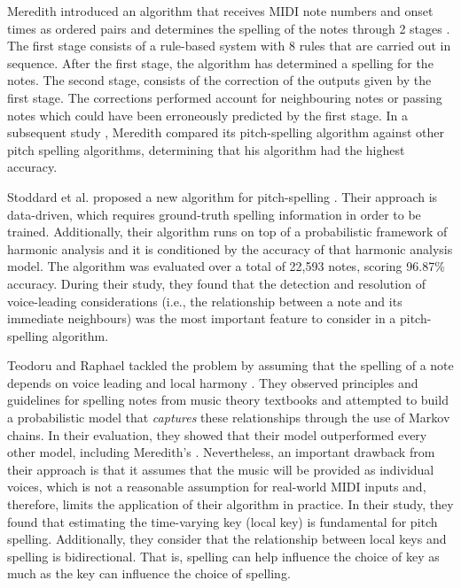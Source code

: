 Meredith introduced an algorithm that receives MIDI note numbers and onset times as ordered pairs and determines the spelling of the notes through 2 stages \cite{meredith2003pitch}. The first stage consists of a rule-based system with 8 rules that are carried out in sequence. After the first stage, the algorithm has determined a spelling for the notes. The second stage, consists of the correction of the outputs given by the first stage. The corrections performed account for neighbouring notes or passing notes which could have been erroneously predicted by the first stage. In a subsequent study \cite{meredith2005comparing}, Meredith compared its pitch-spelling algorithm against other pitch spelling algorithms, determining that his algorithm had the highest accuracy. 



Stoddard et al. proposed a new algorithm for pitch-spelling \cite{stoddard2004welltempered}. Their approach is data-driven, which requires ground-truth spelling information in order to be trained. Additionally, their algorithm runs on top of a probabilistic framework of harmonic analysis \cite{raphael2003harmonic} and it is conditioned by the accuracy of that harmonic analysis model. The algorithm was evaluated over a total of 22,593 notes, scoring 96.87\% accuracy. During their study, they found that the detection and resolution of voice-leading considerations (i.e., the relationship between a note and its immediate neighbours) was the most important feature to consider in a pitch-spelling algorithm.

Teodoru and Raphael tackled the problem by assuming that the spelling of a note depends on voice leading and local harmony \cite{teodoru2007pitch}. They observed principles and guidelines for spelling notes from music theory textbooks \cite{aldwell2017harmony, rimskykorsakov2005practical} and attempted to build a probabilistic model that \emph{captures} these relationships through the use of Markov chains. In their evaluation, they showed that their model outperformed every other model, including Meredith's \cite{meredith_ps13_2006}. Nevertheless, an important drawback from their approach is that it assumes that the music will be provided as individual voices, which is not a reasonable assumption for real-world MIDI inputs and, therefore, limits the application of their algorithm in practice. In their study, they found that estimating the time-varying key (local key) is fundamental for pitch spelling. Additionally, they consider that the relationship between local keys and spelling is bidirectional. That is, spelling can help influence the choice of key as much as the key can influence the choice of spelling.



